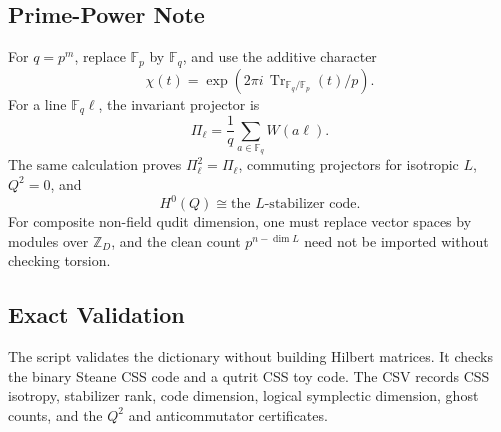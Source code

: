\subsection{Prime-Power Note}

For \(q=p^m\), replace \(\mathbb F_p\) by \(\mathbb F_q\), and use the additive
character
\[
  \chi(t)=\exp(2\pi i\,\operatorname{Tr}_{\mathbb F_q/\mathbb F_p}(t)/p).
\]
For a line \(\mathbb F_q\ell\), the invariant projector is
\[
  \Pi_\ell=\frac1q\sum_{a\in\mathbb F_q}W(a\ell).
\]
The same calculation proves \(\Pi_\ell^2=\Pi_\ell\), commuting projectors for
isotropic \(L\), \(Q^2=0\), and
\[
  H^0(Q)\cong\text{the }L\text{-stabilizer code}.
\]
For composite non-field qudit dimension, one must replace vector spaces by
modules over \(\mathbb Z_D\), and the clean count \(p^{n-\dim L}\) need not be
imported without checking torsion.

\subsection{Exact Validation}

The script 
validates the dictionary without building Hilbert matrices. It checks the binary
Steane CSS code and a qutrit CSS toy code. The CSV
records CSS isotropy, stabilizer rank, code dimension, logical symplectic
dimension, ghost counts, and the \(Q^2\) and anticommutator certificates.
